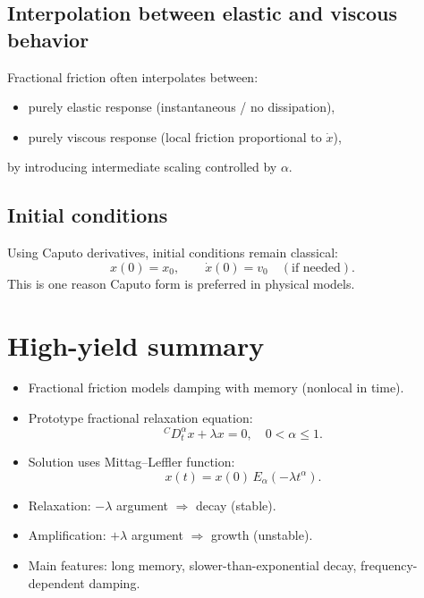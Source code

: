 \subsection{Interpolation between elastic and viscous behavior}
Fractional friction often interpolates between:
\begin{itemize}
\item purely elastic response (instantaneous / no dissipation),
\item purely viscous response (local friction proportional to $\dot{x}$),
\end{itemize}
by introducing intermediate scaling controlled by $\alpha$.

\subsection{Initial conditions}
Using Caputo derivatives, initial conditions remain classical:
\begin{equation}
x(0)=x_0,
\qquad
\dot{x}(0)=v_0 \quad (\text{if needed}).
\end{equation}
This is one reason Caputo form is preferred in physical models.


\section{High-yield summary}

\begin{itemize}
\item Fractional friction models damping with memory (nonlocal in time).
\item Prototype fractional relaxation equation:
\[
{}^{C}D_t^\alpha x + \lambda x=0,\quad 0<\alpha\le 1.
\]
\item Solution uses Mittag--Leffler function:
\[
x(t)=x(0)\,E_\alpha(-\lambda t^\alpha).
\]
\item Relaxation: $-\lambda$ argument $\Rightarrow$ decay (stable).
\item Amplification: $+\lambda$ argument $\Rightarrow$ growth (unstable).
\item Main features: long memory, slower-than-exponential decay, frequency-dependent damping.
\end{itemize}
